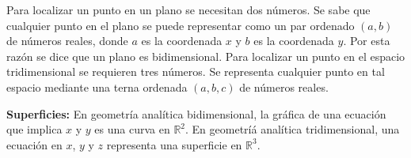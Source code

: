 Para localizar un punto en un plano se necesitan dos números. Se sabe que cualquier punto en el plano se puede representar como un par ordenado ${\left(a,b\right)}$ de números reales, donde ${a}$ es la coordenada ${x}$ y ${b}$ es la coordenada ${y}$. Por esta razón se dice que un plano es bidimensional. Para localizar un punto en el espacio tridimensional se requieren tres números. Se representa cualquier punto en tal espacio mediante una terna ordenada ${\left(a, b, c\right)}$ de números reales.

\vspace{4mm}
\textbf{Superficies:} En geometría analítica bidimensional, la gráfica de una ecuación que implica ${x}$ y ${y}$ es una curva en ${\mathbb{R}^{2}}$. En geometríá analítica tridimensional, una ecuación en ${x}$, ${y}$ y ${z}$ representa una superficie en ${\mathbb{R}^{3}}$.

\label{espacio_tridimensional}
